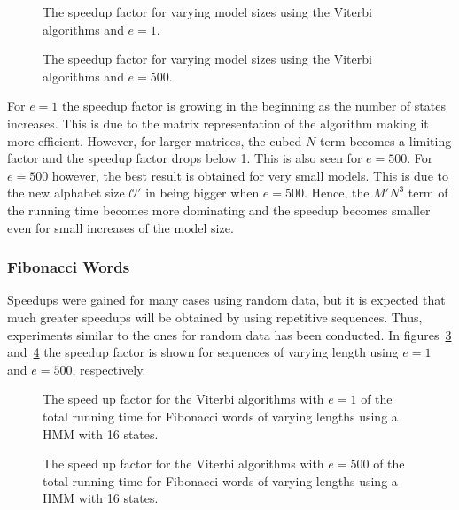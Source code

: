 \begin{figure}
  \centering
  
  \caption{The speedup factor for varying model sizes using the Viterbi
    algorithms and $e = 1$.}
  \label{fig:speedup_vs_N}
\end{figure}

\begin{figure}
  \centering
  
  \caption{The speedup factor for varying model sizes using the Viterbi
    algorithms and $e=500$.}
  \label{fig:speedup_vs_N2}
\end{figure}

For $e = 1$ the speedup factor is growing in the beginning as the number of
states increases. This is due to the matrix representation of the algorithm
making it more efficient. However, for larger matrices, the cubed $N$ term
becomes a limiting factor and the speedup factor drops below 1. This is also
seen for $e = 500$. For $e = 500$ however, the best result is obtained for very
small models. This is due to the new alphabet size $\mathcal{O'}$ in being
bigger when $e = 500$. Hence, the $M' N^3$ term of the running time becomes
more dominating and the speedup becomes smaller even for small increases of the
model size.

\subsubsection{Fibonacci Words}

Speedups were gained for many cases using random data, but it is
expected that much greater speedups will be obtained by using repetitive
sequences. Thus, experiments similar to the ones for random data has been
conducted. In figures~\ref{fig:fib_compressed_1_speedup_vs_sequence_length}
and~\ref{fig:fib_compressed_500_speedup_vs_sequence_length} the speedup factor
is shown for sequences of varying length using $e = 1$ and $e = 500$, respectively.

\begin{figure}
  \centering
  
  \caption{The speed up factor for the Viterbi algorithms with $e = 1$ of the total
    running time for Fibonacci words of varying
    lengths using a HMM with 16 states.}
  \label{fig:fib_compressed_1_speedup_vs_sequence_length}
\end{figure}

\begin{figure}
  \centering
  
  \caption{The speed up factor for the Viterbi algorithms with $e = 500$ of the total
    running time for Fibonacci words of varying
    lengths using a HMM with 16 states.}
  \label{fig:fib_compressed_500_speedup_vs_sequence_length}
\end{figure}

